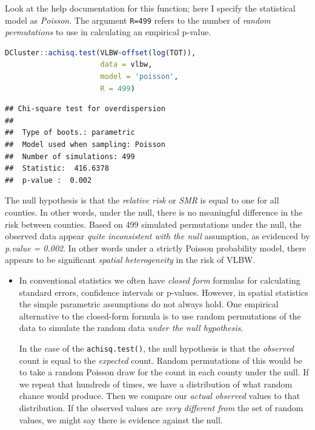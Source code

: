 \documentclass[
]{book}
\newcommand{\passthrough}[1]{#1}
\newenvironment{rmdblock}[1]
  {%
  \begin{itemize}
  \renewcommand{\labelitemi}{
    \raisebox{-.7\height}[0pt][0pt]{
      {\setkeys{Gin}{width=3em,keepaspectratio}\texttt{[image: images/\#1]}}
    }
  }
  \item
  }
  {
  \end{itemize}
  }
\newenvironment{rmdnote}
  {\begin{rmdblock}{note}}
  {\end{rmdblock}}
\begin{document}
Look at the help documentation for this function; here I specify the statistical model as \emph{Poisson}. The argument \passthrough{\lstinline!R=499!} refers to the number of \emph{random permutations} to use in calculating an empirical p-value.

\begin{lstlisting}[language=R]
DCluster::achisq.test(VLBW~offset(log(TOT)), 
                      data = vlbw, 
                      model = 'poisson',
                      R = 499)
\end{lstlisting}

\begin{lstlisting}
## Chi-square test for overdispersion 
## 
## 	Type of boots.: parametric 
## 	Model used when sampling: Poisson 
## 	Number of simulations: 499 
## 	Statistic:  416.6378 
## 	p-value :  0.002
\end{lstlisting}

The null hypothesis is that the \emph{relative risk} or \emph{SMR} is equal to one for all counties. In other words, under the null, there is no meaningful difference in the risk between counties. Based on 499 simulated permutations under the null, the observed data appear \emph{quite inconsistent with the null} assumption, as evidenced by \emph{p.value = 0.002}. In other words under a strictly Poisson probability model, there appears to be significant \emph{spatial heterogeneity} in the risk of VLBW.

\begin{rmdnote}
In conventional statistics we often have \emph{closed form} formulas for calculating standard errors, confidence intervals or p-values. However, in spatial statistics the simple parametric assumptions do not always hold. One empirical alternative to the closed-form formula is to use random permutations of the data to simulate the random data \emph{under the null hypothesis}.

In the case of the \passthrough{\lstinline!achisq.test()!}, the null hypothesis is that the \emph{observed} count is equal to the \emph{expected} count. Random permutations of this would be to take a random Poisson draw for the count in each county under the null. If we repeat that hundreds of times, we have a distribution of what random chance would produce. Then we compare our \emph{actual observed} values to that distribution. If the observed values are \emph{very different from} the set of random values, we might say there is evidence against the null.
\end{rmdnote}
\end{document}
